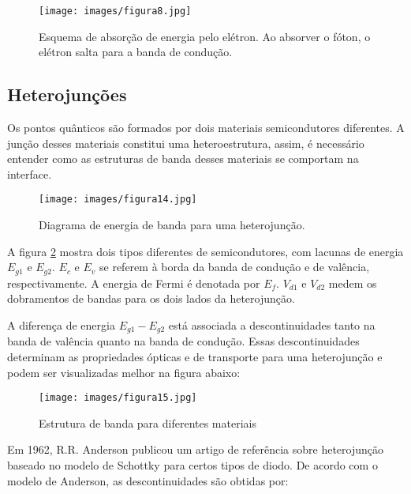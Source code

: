  		\begin{figure}[H]
	      \caption{Esquema de absorção de energia pelo elétron. Ao absorver o fóton, o elétron salta para a banda de condução.\cite{qm_fis0}}
	      \centering
	      \texttt{[image: images/figura8.jpg]}
	      \label{fig8}
	    \end{figure}

\subsection{Heterojunções}

	\par Os pontos quânticos são formados por dois materiais semicondutores diferentes. A junção desses materiais constitui uma heteroestrutura, assim, é necessário entender como as estruturas de banda desses materiais se comportam na interface\cite{bulk2}.

	\begin{figure}[H]
	  \caption{Diagrama de energia de banda para uma heterojunção.\cite{heterojuncao}}
	  \centering
	  \texttt{[image: images/figura14.jpg]}
	  \label{fig14}
	\end{figure}

	\par A figura \ref{fig14} mostra dois tipos diferentes de semicondutores, com lacunas de energia $E_{g1}$ e $E_{g2}$. $E_{c}$ e $E_{v}$ se referem à borda da banda de condução e de valência, respectivamente. A energia de Fermi é denotada por $E_{f}$. $V_{d1}$ e $V_{d2}$ medem os dobramentos de bandas para os dois lados da heterojunção.

	\par A diferença de energia $E_{g1}-E_{g2}$ está associada a descontinuidades tanto na banda de valência quanto na banda de condução. Essas descontinuidades determinam as propriedades ópticas e de transporte para uma heterojunção e podem ser  visualizadas melhor na figura abaixo: 

	\begin{figure}[H]
	  \caption{Estrutura de banda para diferentes materiais\cite{heterojuncao}}
	  \centering
	  \texttt{[image: images/figura15.jpg]}
	  \label{fig15}
	\end{figure}

	\par Em 1962, R.R. Anderson publicou um artigo de referência sobre heterojunção baseado no modelo de Schottky para certos tipos de diodo\cite{heterojuncao}. De acordo com o modelo de Anderson, as descontinuidades são obtidas por:

